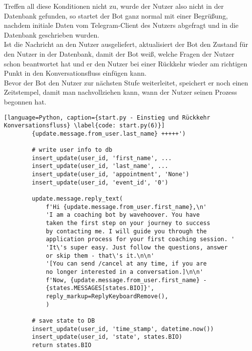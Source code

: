            Treffen all diese Konditionen nicht zu, wurde der Nutzer also nicht in der Datenbank gefunden, so startet der Bot ganz normal mit einer Begrüßung, nachdem initiale Daten vom Telegram-Client des Nutzers abgefragt und in die Datenbank geschrieben wurden. \\
            Ist die Nachricht an den Nutzer ausgeliefert, aktualisiert der Bot den Zustand für den Nutzer in der Datenbank, damit der Bot weiß, welche Fragen der Nutzer schon beantwortet hat und er den Nutzer bei einer Rückkehr wieder am richtigen Punkt in den Konversationsfluss einfügen kann.\\
            Bevor der Bot den Nutzer zur nächsten Stufe weiterleitet, speichert er noch einen Zeitstempel, damit man nachvollziehen kann, wann der Nutzer seinen Prozess begonnen hat.
            \begin{lstlisting}[language=Python, caption={start.py - Einstieg und Rückkehr Konversationsfluss} \label{code: start.py(6)}]
        {update.message.from_user.last_name} +++++')

        # write user info to db
        insert_update(user_id, 'first_name', ...
        insert_update(user_id, 'last_name', ...
        insert_update(user_id, 'appointment', 'None')
        insert_update(user_id, 'event_id', '0')

        update.message.reply_text(
            f'Hi {update.message.from_user.first_name},\n'
            'I am a coaching bot by wavehoover. You have 
            taken the first step on your journey to success 
            by contacting me. I will guide you through the 
            application process for your first coaching session. '
            'It\'s super easy. Just follow the questions, answer 
            or skip them - that\'s it.\n\n'
            '[You can send /cancel at any time, if you are 
            no longer interested in a conversation.]\n\n'
            f'Now, {update.message.from_user.first_name} - 
            {states.MESSAGES[states.BIO]}',
            reply_markup=ReplyKeyboardRemove(),
            )

        # save state to DB
        insert_update(user_id, 'time_stamp', datetime.now())
        insert_update(user_id, 'state', states.BIO)
        return states.BIO
            \end{lstlisting}

